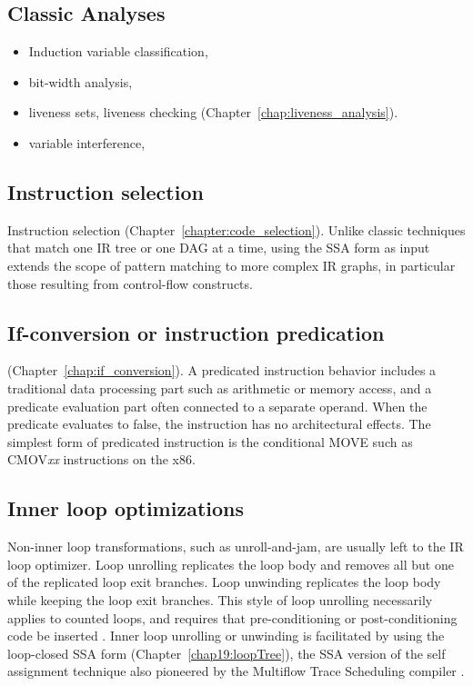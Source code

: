 \subsection{Classic Analyses}

\begin{itemize}

\item Induction variable classification,

\item bit-width analysis,

\item liveness sets, liveness checking
(Chapter~\ref{chap:liveness_analysis}).

\item variable interference,

\end{itemize}

\subsection{Instruction selection}

Instruction selection (Chapter~\ref{chapter:code_selection}). Unlike
classic techniques that match one IR tree or one DAG at a time, using the SSA
form as input extends the scope of pattern matching to more complex IR graphs,
in particular those resulting from control-flow constructs.

\subsection{If-conversion or instruction predication}

(Chapter~\ref{chap:if_conversion}). A predicated instruction behavior includes a
traditional data processing part such as arithmetic or memory access, and a
predicate evaluation part often connected to a separate operand. When the
predicate evaluates to false, the instruction has no architectural effects. The
simplest form of predicated instruction is the conditional MOVE such as
CMOV\emph{xx} instructions on the x86. 

\subsection{Inner loop optimizations}

Non-inner loop transformations, such as
unroll-and-jam, are usually left to the IR loop optimizer. Loop unrolling
replicates the loop body and removes all but one of the replicated loop exit
branches. Loop unwinding replicates the loop body while keeping the loop exit
branches. This style of loop unrolling necessarily applies to counted loops, and
requires that pre-conditioning or post-conditioning code be inserted
\cite{Lownet:1992:JS}. Inner loop unrolling or unwinding is facilitated by using
the loop-closed SSA form (Chapter~\ref{chap19:loopTree}), the SSA version of the
self assignment technique also pioneered by the Multiflow Trace Scheduling
compiler \cite{Lownet:1992:JS}.


